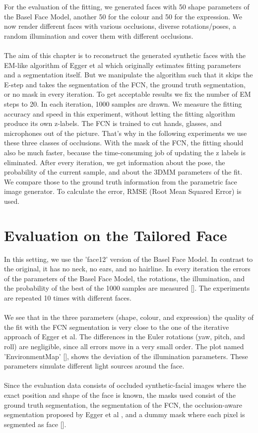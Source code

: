 For the evaluation of the fitting, we generated faces with 50 shape parameters of the Basel Face Model, another 50 for the colour and 50 for the expression. We now render different faces with various occlusions, diverse rotations/poses, a random illumination and cover them with different occlusions.\\
\\
The aim of this chapter is to reconstruct the generated synthetic faces with the EM-like algorithm of Egger et al which originally estimates fitting parameters and a segmentation itself. But we manipulate the algorithm such that it skips the E-step and takes the segmentation of the FCN, the ground truth segmentation, or no mask in every iteration. To get acceptable results we fix the number of EM steps to 20. In each iteration, 1000 samples are drawn. We measure the fitting accuracy and speed in this experiment, without letting the fitting algorithm produce its own z-labels. The FCN is trained to cut hands, glasses, and microphones out of the picture. That's why in the following experiments we use these three classes of occlusions. With the mask of the FCN, the fitting should  also be much faster, because the time-consuming job of updating the z labels is eliminated. After every iteration, we get information about the pose, the probability of the current sample, and about the 3DMM parameters of the fit. We compare those to the ground truth information from the parametric face image generator. To calculate the error, RMSE (Root Mean Squared Error) is used.

\section{Evaluation on the Tailored Face}
In this setting, we use the 'face12' version of the Basel Face Model. In contrast to the original, it has no neck, no ears, and no hairline. In every iteration the errors of the parameters of the Basel Face Model, the rotations, the illumination, and the probability of the best of the 1000 samples are measured []. The experiments are repeated 10 times with different faces.\\ 
\\
We see that in the three parameters (shape, colour, and expression) the quality of the fit with the FCN segmentation is very close to the one of the iterative approach of Egger et al. The differences in the Euler rotations (yaw, pitch, and roll) are negligible, since all errors move in a very small order. The plot named 'EnvironmentMap' [], shows the deviation of the illumination parameters. These parameters simulate different light sources around the face.\\
\\
Since the evaluation data consists of occluded synthetic-facial images where the exact position and shape of the face is known, the masks used consist of the ground truth segmentation, the segmentation of the FCN, the occlusion-aware segmentation proposed by Egger et al \cite{egger_paper}, and a dummy mask where each pixel is segmented as face [].


